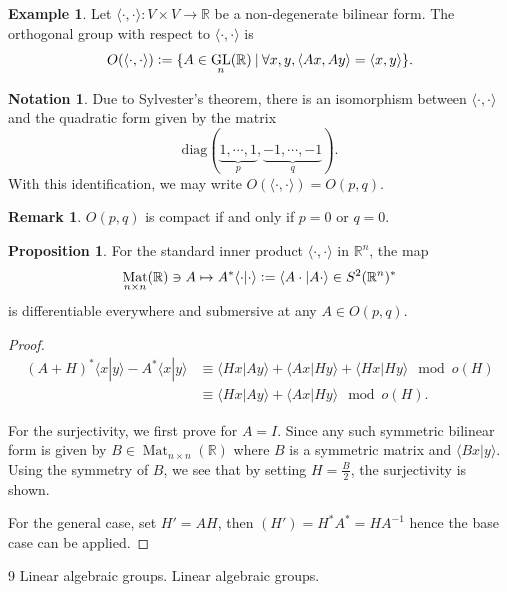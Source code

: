 \documentclass[10pt]{article}
\numberwithin{equation}{section}
\theoremstyle{definition}
\newtheorem{proposition}{Proposition}[section]
\newtheorem{notation}{Notation}[section]
\newtheorem{remark}{Remark}[section]
\newtheorem{example}{Example}[section]
\DeclareMathOperator{\GL}{GL}
\DeclareMathOperator{\Mat}{Mat}
\newcommand{\defeq}{\vcentcolon=}
\newcommand{\R}[0]{\mathbb{R}}
\newcommand{\sep}[0]{\:|\:}
\begin{document}
\begin{example}
    Let $\langle\cdot,\cdot\rangle:V\times V\to \R$ be a non-degenerate bilinear form. The orthogonal group with respect to $\langle\cdot,\cdot\rangle$ is  
    \begin{equation*}
        O(\langle\cdot,\cdot\rangle) \defeq \{A\in\GL_n(\R)\sep \forall x,y, \langle Ax,Ay\rangle = \langle x,y\rangle\}.
    \end{equation*}
\end{example}

\begin{notation}
Due to Sylvester's theorem, there is an isomorphism between $\langle\cdot,\cdot\rangle$ and the quadratic form given by the matrix
\begin{equation*}
    \mathrm{diag}(\underbrace{1,\cdots,1}_{p},\underbrace{-1,\cdots,-1}_{q}).
\end{equation*}
With this identification, we may write $O(\langle\cdot,\cdot\rangle) = O(p,q)$.
\end{notation}
\begin{remark}
    $O(p,q)$ is compact if and only if $p=0$ or $q=0$.
\end{remark}

\begin{proposition}
    For the standard inner product $\langle\cdot,\cdot\rangle$ in $\R^n$, the map
    \begin{equation*}
        \Mat_{n\times n}(\R)\ni A\mapsto A^*\langle\cdot|\cdot\rangle \defeq \langle A\cdot|A\cdot\rangle\in S^2(\R^n)^*
    \end{equation*}
    is differentiable everywhere and submersive at any $A\in O(p,q)$.
\end{proposition}
\begin{proof}
    \begin{align*}
        (A+H)^*\langle x|y\rangle-A^*\langle x|y\rangle & \equiv \langle Hx|Ay\rangle+\langle Ax|Hy\rangle +\langle Hx|Hy\rangle\mod{o(H)}\\
        &\equiv \langle Hx|Ay\rangle+\langle Ax|Hy\rangle\mod{o(H)}.
    \end{align*}
    \par For the surjectivity, we first prove for $A=I$. Since any such symmetric bilinear form is given by $B\in\Mat_{n\times n}(\R)$ where $B$ is a symmetric matrix and $\langle Bx|y\rangle$. Using the symmetry of $B$, we see that by setting $H={\frac B 2}$, the surjectivity is shown.
    \par For the general case, set $H' = AH$, then $(H') = H^*A^* = HA^{-1}$ hence the base case can be applied.
\end{proof}



\begin{thebibliography}{9}
 Linear algebraic groups.
 Linear algebraic groups.
\end{thebibliography}
\end{document}
